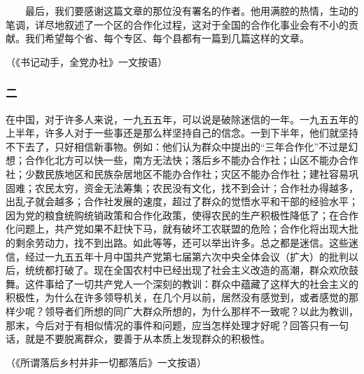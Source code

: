 \documentclass[cn,11pt,chinese]{elegantbook}
\def\myformat#1{\hfil\hfil #1}
\begin{document}
　　最后，我们要感谢这篇文章的那位没有署名的作者。他用满腔的热情，生动的笔调，详尽地叙述了一个区的合作化过程，这对于全国的合作化事业会有不小的贡献。我们希望每个省、每个专区、每个县都有一篇到几篇这样的文章。\\
\begin{flushright}（《书记动手，全党办社》一文按语）\end{flushright}
\subsubsection*{\myformat{二}}
在中国，对于许多人来说，一九五五年，可以说是破除迷信的一年。一九五五年的上半年，许多人对于一些事还是那么样坚持自己的信念。一到下半年，他们就坚持不下去了，只好相信新事物。例如：他们认为群众中提出的“三年合作化”不过是幻想；合作化北方可以快一些，南方无法快；落后乡不能办合作社；山区不能办合作社；少数民族地区和民族杂居地区不能办合作社；灾区不能办合作社；建社容易巩固难；农民太穷，资金无法筹集；农民没有文化，找不到会计；合作社办得越多，出乱子就会越多；合作社发展的速度，超过了群众的觉悟水平和干部的经验水平；因为党的粮食统购统销政策和合作化政策，使得农民的生产积极性降低了；在合作化问题上，共产党如果不赶快下马，就有破坏工农联盟的危险；合作化将出现大批的剩余劳动力，找不到出路。如此等等，还可以举出许多。总之都是迷信。这些迷信，经过一九五五年十月中国共产党第七届第六次中央全体会议（扩大）的批判以后，统统都打破了。现在全国农村中已经出现了社会主义改造的高潮，群众欢欣鼓舞。这件事给了一切共产党人一个深刻的教训：群众中蕴藏了这样大的社会主义的积极性，为什么在许多领导机关，在几个月以前，居然没有感觉到，或者感觉的那样少呢？领导者们所想的同广大群众所想的，为什么那样不一致呢？以此为教训，那末，今后对于有相似情况的事件和问题，应当怎样处理才好呢？回答只有一句话，就是不要脱离群众，要善于从本质上发现群众的积极性。\\
\begin{flushright}（《所谓落后乡村并非一切都落后》一文按语）\end{flushright}
\end{document}
